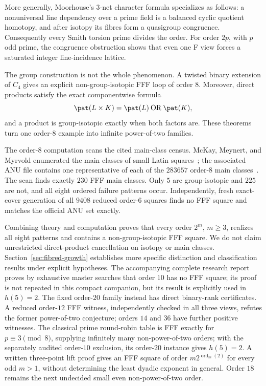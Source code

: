 More generally, Moorhouse's $3$-net character formula specializes as follows:
a nonuniversal line dependency over a prime field is a
balanced cyclic quotient homotopy, and after isotopy its fibres form a
quasigroup congruence.  Consequently every Smith torsion prime divides the
order.  For order $2p$, with $p$ odd prime, the congruence obstruction shows
that even one F view forces a saturated integer line-incidence lattice.

The group construction is not the whole phenomenon.  A twisted binary
extension of $C_4$ gives an explicit non-group-isotopic FFF loop of order $8$.
Moreover, direct products satisfy the exact componentwise formula
\[
  \pat(L\times K)=\pat(L)\mathbin{\mathrm{OR}}\pat(K),
\]
and a product is group-isotopic exactly when both factors are.  These theorems
turn one order-$8$ example into infinite power-of-two families.

The order-$8$ computation scans the cited main-class census.  McKay,
Meynert, and Myrvold enumerated the main classes of small Latin
squares~\cite{McKayMeynertMyrvold2007};
the associated ANU file contains one representative of each of the $283657$
order-$8$ main classes~\cite{McKayLatinData}.  The scan finds exactly $230$
FFF main classes.  Only $5$ are group-isotopic and $225$ are not, and all
eight ordered failure patterns occur.  Independently, fresh exact-cover
generation of all $9408$ reduced order-$6$ squares finds no FFF square and
matches the official ANU set exactly.

Combining theory and computation proves that every order $2^m$, $m\geq3$,
realizes all eight patterns and contains a non-group-isotopic FFF square.  We
do not claim unrestricted direct-product cancellation on isotopy or main
classes. Section~\ref{sec:fibred-growth} establishes more specific
distinction and classification results under explicit hypotheses.
The accompanying
complete research report proves by exhaustive master searches that order $10$
has no FFF square; its proof is not repeated in this compact companion,
but its result is explicitly used in $h(5)=2$. The fixed order-$20$ family
instead has direct binary-rank certificates. A reduced order-$12$ FFF witness, independently checked in all three
views, refutes the former power-of-two conjecture; orders $14$ and $36$ have
further positive witnesses. The classical prime round-robin table is FFF
exactly for $p\equiv3\pmod8$, supplying infinitely many non-power-of-two
orders; with the separately audited order-$10$ exclusion, its order-$20$
instance gives $h(5)=2$. A written three-point lift proof gives an FFF
square of order $m2^{\operatorname{ord}_m(2)}$ for every odd $m>1$, without
determining the least dyadic exponent in general.  Order $18$ remains the
next undecided small even non-power-of-two order.

